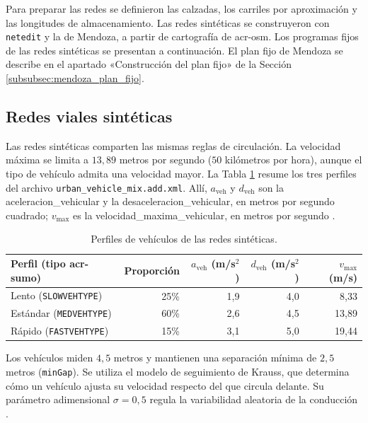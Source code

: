 Para preparar las redes se definieron las calzadas, los carriles por aproximación y las longitudes de almacenamiento. Las redes sintéticas se construyeron con \texttt{netedit} y la de Mendoza, a partir de cartografía de \acrshort{acr-osm}. Los programas fijos de las redes sintéticas se presentan a continuación. El plan fijo de Mendoza se describe en el apartado «Construcción del plan fijo» de la Sección \ref{subsubsec:mendoza_plan_fijo}.

\subsection{Redes viales sintéticas}
\label{subsec:escenarios_sinteticos}

Las redes sintéticas comparten las mismas reglas de circulación. La velocidad máxima se limita a $13{,}89$ metros por segundo ($50$ kilómetros por hora), aunque el tipo de vehículo admita una velocidad mayor. La Tabla \ref{tab:flota_sintetica} resume los tres perfiles del archivo \texttt{urban\_\allowbreak vehicle\_\allowbreak mix.add.xml}. Allí, $a_{\mathrm{veh}}$ y $d_{\mathrm{veh}}$ son la \gls{aceleracion_vehicular} y la \gls{desaceleracion_vehicular}, en metros por segundo cuadrado; $v_{\max}$ es la \gls{velocidad_maxima_vehicular}, en metros por segundo \cite{SUMO2026_SUMO}.

\begin{table}[H]\centering\small
\caption{Perfiles de vehículos de las redes sintéticas.}\label{tab:flota_sintetica}
\begin{tabular}{lrrrr}\hline
\textbf{Perfil (tipo \acrshort{acr-sumo})} & \textbf{Proporción} & \textbf{\boldmath$a_{\mathrm{veh}}$ (m/s$^2$)} & \textbf{\boldmath$d_{\mathrm{veh}}$ (m/s$^2$)} & \textbf{\boldmath$v_{\max}$ (m/s)} \\\hline
Lento (\texttt{SLOWVEHTYPE}) & 25\% & 1,9 & 4,0 & 8,33 \\
Estándar (\texttt{MEDVEHTYPE}) & 60\% & 2,6 & 4,5 & 13,89 \\
Rápido (\texttt{FASTVEHTYPE}) & 15\% & 3,1 & 5,0 & 19,44 \\\hline
\end{tabular}\end{table}

Los vehículos miden $4{,}5$ metros y mantienen una separación mínima de $2{,}5$ metros (\texttt{minGap}). Se utiliza el modelo de seguimiento de Krauss, que determina cómo un vehículo ajusta su velocidad respecto del que circula delante. Su parámetro adimensional $\sigma=0{,}5$ regula la variabilidad aleatoria de la conducción \cite{krauss1998microscopic,SUMO2026_SUMO}.

